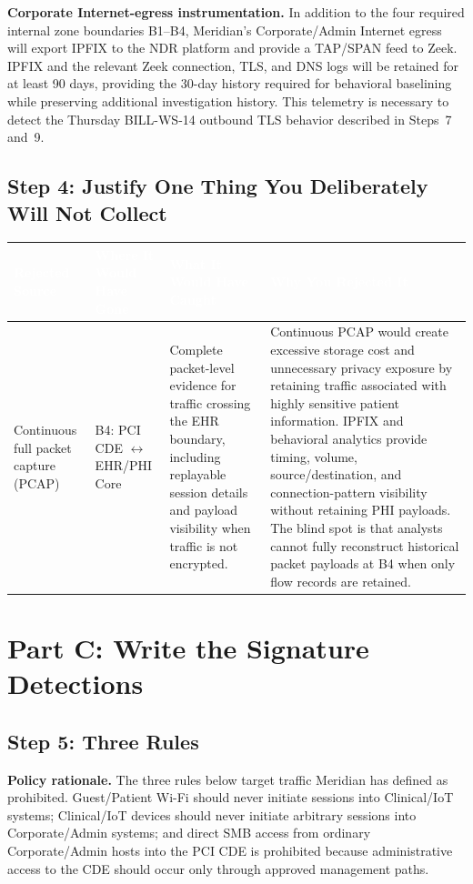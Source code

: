 \documentclass[11pt,letterpaper]{article}
\renewcommand{\arraystretch}{1.22}
\newcommand{\labtablesetup}{%
  \footnotesize
  \setlength{\tabcolsep}{4pt}%
  \renewcommand{\arraystretch}{1.28}%
}
\newcommand{\labpart}[1]{%
  \par\vspace{0.15em}%
  \Needspace{10\baselineskip}%
  \section*{#1}%
  \nopagebreak
}
\newcommand{\labstep}[1]{%
  \Needspace{8\baselineskip}%
  \subsection*{#1}%
  \nopagebreak
}
\begin{document}
\textbf{Corporate Internet-egress instrumentation.} In addition to the four required internal zone boundaries B1--B4, Meridian's Corporate/Admin Internet egress will export IPFIX to the NDR platform and provide a TAP/SPAN feed to Zeek. IPFIX and the relevant Zeek connection, TLS, and DNS logs will be retained for at least 90 days, providing the 30-day history required for behavioral baselining while preserving additional investigation history. This telemetry is necessary to detect the Thursday BILL-WS-14 outbound TLS behavior described in Steps~7 and~9.

\labstep{Step 4: Justify One Thing You Deliberately Will Not Collect}

\begingroup\labtablesetup
{}
\begin{tabularx}{\textwidth}{@{}L{2.4cm}L{2.6cm}Y Y@{}}
\toprule
{}
\textcolor{white}{\textbf{Rejected Source}} &
\textcolor{white}{\textbf{Where It Would Have Gone}} &
\textcolor{white}{\textbf{What It Would Have Caught}} &
\textcolor{white}{\textbf{Why You Rejected It}} \\
\midrule
Continuous full packet capture (PCAP) &
B4: PCI CDE $\leftrightarrow$ EHR/PHI Core &
Complete packet-level evidence for traffic crossing the EHR boundary, including replayable session details and payload visibility when traffic is not encrypted. &
Continuous PCAP would create excessive storage cost and unnecessary privacy exposure by retaining traffic associated with highly sensitive patient information. IPFIX and behavioral analytics provide timing, volume, source/destination, and connection-pattern visibility without retaining PHI payloads. The blind spot is that analysts cannot fully reconstruct historical packet payloads at B4 when only flow records are retained. \\
\bottomrule
\end{tabularx}
\endgroup

\labpart{Part C: Write the Signature Detections}

\labstep{Step 5: Three Rules}

\textbf{Policy rationale.} The three rules below target traffic Meridian has defined as prohibited. Guest/Patient Wi-Fi should never initiate sessions into Clinical/IoT systems; Clinical/IoT devices should never initiate arbitrary sessions into Corporate/Admin systems; and direct SMB access from ordinary Corporate/Admin hosts into the PCI CDE is prohibited because administrative access to the CDE should occur only through approved management paths.
\end{document}
